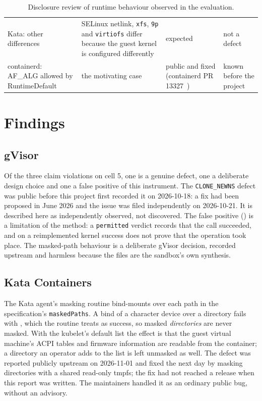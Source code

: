 \begin{table}[htbp]
\begin{tabularx}{\textwidth}{@{}P{3.1cm}LP{3.1cm}P{2.2cm}@{}}
Kata: other differences & SELinux netlink, \texttt{xfs}, \texttt{9p} and \texttt{virtiofs} differ because the guest kernel is configured differently & expected & not a defect \\
containerd: AF\_ALG allowed by RuntimeDefault & the motivating case & public and fixed (containerd PR 13327~\cite{containerd13327}) & known before the project \\
\bottomrule
\end{tabularx}
\caption{Disclosure review of runtime behaviour observed in the evaluation.}
\label{tab:disclosure}
\end{table}

\section{Findings}

\subsection{gVisor}
Of the three claim violations on cell 5, one is a genuine defect, one a deliberate design choice and one a false positive of this instrument. The \texttt{CLONE\_NEWNS} defect was public before this project first recorded it on 2026-10-18: a fix had been proposed in June 2026 and the issue was filed independently on 2026-10-21. It is described here as independently observed, not discovered. The false positive () is a limitation of the method: a \texttt{permitted} verdict records that the call succeeded, and on a reimplemented kernel success does not prove that the operation took place. The masked-path behaviour is a deliberate gVisor decision, recorded upstream and harmless because the files are the sandbox's own synthesis.

\subsection{Kata Containers}
The Kata agent's masking routine bind-mounts  over each path in the specification's \texttt{maskedPaths}. A bind of a character device over a directory fails with , which the routine treats as success, so masked \emph{directories} are never masked. With the kubelet's default list the effect is that the guest virtual machine's ACPI tables and firmware information are readable from the container; a directory an operator adds to the list is left unmasked as well. The defect was reported publicly upstream on 2026-11-01 and fixed the next day by masking directories with a shared read-only tmpfs; the fix had not reached a release when this report was written. The maintainers handled it as an ordinary public bug, without an advisory.

